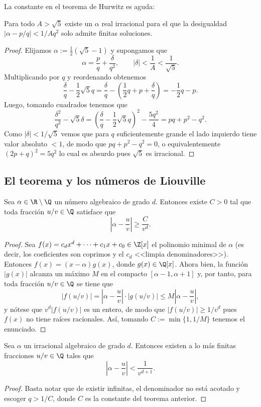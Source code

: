 \documentclass[teoria-numeros.tex]{subfiles}
\begin{document}
La constante en el teorema de Hurwitz es aguda:
\begin{prop}
	Para todo $A > \sqrt{5}$ existe un $\alpha$ real irracional para el que la desigualdad $|\alpha - p/q| < 1/Aq^2$ solo admite finitas soluciones.
\end{prop}
\begin{proof}
	Elijamos $\alpha := \frac{1}{2}( \sqrt{5} - 1 )$ y supongamos que
	$$ \alpha = \frac{p}{q} + \frac{\delta}{q^2}, \qquad |\delta| < \frac{1}{A} < \frac{1}{\sqrt{5}}. $$
	Multiplicando por $q$ y reordenando obtenemos
	$$ \frac{\delta}{q} - \frac{1}{2} \sqrt{5}q = \frac{\delta}{q} - \left( \frac{1}{2}q + p + \frac{\delta}{q} \right) = -\frac{1}{2}q - p. $$
	Luego, tomando cuadrados tenemos que
	$$ \frac{\delta^2}{q^2} - \sqrt{5}\delta = \left( \frac{\delta}{q} - \frac{1}{2} \sqrt{5}q \right)^2 - \frac{5q^2}{4} = pq + p^2 - q^2. $$
	Como $|\delta| < 1/\sqrt{5}$ vemos que para $q$ suficientemente grande el lado izquierdo tiene valor absoluto $<1$,
	de modo que $pq + p^2 - q^2 = 0$, o equivalentemente $(2p + q)^2 = 5q^2$ lo cual es absurdo pues $\sqrt{5}$ es irracional.
\end{proof}

\subsection{El teorema y los números de Liouville}
\begin{thm}
	Sea $\alpha \in \R \setminus \Q$ un número algebraico de grado $d$.
	Entonces existe $C > 0$ tal que toda fracción $u/v \in \Q$ satisface que
	$$ \left| \alpha - \frac{u}{v} \right| \ge \frac{C}{v^d}. $$
\end{thm}
\begin{proof}
	Sea $f(x) = c_d x^d + \cdots + c_1 x + c_0 \in \Z[x]$ el polinomio minimal de $\alpha$ (es decir, los coeficientes son coprimos y
	el $c_d$ <<limpia denominadores>>). Entonces $f(x) = (x - \alpha)g(x)$, donde $g(x) \in \Q[x]$.
	Ahora bien, la función $|g(x)|$ alcanza un máximo $M$ en el compacto $[\alpha - 1, \alpha + 1]$ y, por tanto,
	para toda fracción $u/v \in \Q$ se tiene que
	$$ |f(u/v)| = \left| \alpha - \frac{u}{v} \right| \cdot |g(u/v)| \le M\left| \alpha - \frac{u}{v} \right|, $$
	y nótese que $v^d |f(u/v)|$ es un entero, de modo que $|f(u/v)| \ge 1/v^d$ pues $f(x)$ no tiene raíces racionales.
	Así, tomando $C := \min\{ 1, 1/M \}$ tenemos el enunciado.
\end{proof}
\begin{cor}
	Sea $\alpha$ un irracional algebraico de grado $d$.
	Entonces existen a lo más finitas fracciones $u/v \in \Q$ tales que
	$$ \left| \alpha - \frac{u}{v} \right| < \frac{1}{v^{d+1}}. $$
\end{cor}
\begin{proof}
	Basta notar que de existir infinitas, el denominador no está acotado y escoger $q > 1/C$, donde $C$ es la constante del teorema anterior.
\end{proof}
\end{document}
